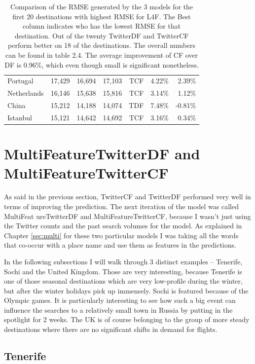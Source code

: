\documentclass[minf,twoside,singlespacing,parskip,frontabs]{infthesis}
\begin{document}
\begin{table}[h]
\begin{center}
\begin{tabular}{ l | r | r | r | r | r | r }
Portugal & 17,429 & 16,694 & 17,103 & TCF & 4.22\% & 2.39\%\\
Netherlands & 16,146 & 15,638 & 15,816 & TCF & 3.14\% & 1.12\%\\
China & 15,212 & 14,188 & 14,074 & TDF & 7.48\% & -0.81\%\\
Istanbul & 15,121 & 14,642 & 14,692 & TCF & 3.16\% & 0.34\%
\end{tabular}
\end{center}
\caption{Comparison of the RMSE generated by the 3 models for the first 20 destinations with highest RMSE for L4F. The Best column indicates who has the lowest RMSE for that destination. Out of the twenty TwitterDF and TwitterCF perform better on 18 of the destinations. The overall numbers can be found in table 2.4. The average improvement of CF over DF is 0.96\%, which even though small is significant nonetheless. }
\label{big-table}
\end{table}

\newpage
\section{MultiFeatureTwitterDF and MultiFeatureTwitterCF}
\label{sec:features}

As said in the previous section, TwitterCF and TwitterDF performed very well in terms of improving the prediction. The next iteration of the model was called MultiFeat	ureTwitterDF and MultiFeatureTwitterCF, because I wasn't just using the Twitter counts and the past search volumes for the model. As explained in Chapter \ref{sec:multi} for these two particular models I was taking all the words that co-occur with a place name and use them as features in the predictions. 

In the following subsections I will walk through 3 distinct examples -- Tenerife, Sochi and the United Kingdom. Those are very interesting, because Tenerife is one of those seasonal destinations which are very low-profile during the winter, but after the winter holidays pick up immensely. Sochi is featured because of the Olympic games. It is particularly interesting to see how such a big event can influence the searches to a relatively small town in Russia by putting in the spotlight for 2 weeks. The UK is of course belonging to the group of more steady destinations where there are no significant shifts in demand for flights. 

\subsection{Tenerife}
\end{document}
